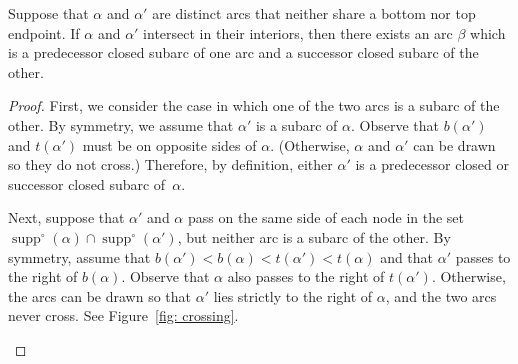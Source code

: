 \documentclass[ALCO,ThmDefs,Unicode,epreuves]{cedram}
\DeclareMathOperator{\supp}{supp}
\newcommand{\suppo}{\supp^{\circ}}
\renewcommand{\1}{\hat{1}}
\newcommand{\0}{\hat{0}}
\begin{document}
\begin{lemma}\label{crossing}
Suppose that $\alpha$ and $\alpha'$ are distinct arcs that neither
share a bottom nor top endpoint.
If $\alpha$ and $\alpha'$ intersect in
their interiors, then there exists an arc $\beta$ which is a predecessor closed subarc of one arc and a successor closed subarc of the other.
\end{lemma}
\begin{proof}
First, we consider the case in which one of the two arcs is a subarc of the other.
By symmetry, we assume that $\alpha'$ is a subarc of $\alpha$.
Observe that $b(\alpha')$ and $t(\alpha')$ must be on opposite sides of $\alpha$.
(Otherwise, $\alpha$ and $\alpha'$ can be drawn so they do not cross.)
Therefore, by definition, either $\alpha'$ is a predecessor closed or
successor closed subarc of~$\alpha$.

Next, suppose that $\alpha'$ and $\alpha$ pass on the same side of each node in the set $\suppo(\alpha)\cap\suppo(\alpha')$, but neither arc is a subarc of the other.
By symmetry, assume that $b(\alpha')<b(\alpha) < t(\alpha')<t(\alpha)$ and that $\alpha'$ passes to the right of $b(\alpha)$.
Observe that $\alpha$ also passes to the right of $t(\alpha')$.
Otherwise, the arcs can be drawn so that $\alpha'$ lies strictly to the right of $\alpha$, and the two arcs never cross.
See Figure~\ref{fig: crossing}.

\begin{figure}[htb]
\end{figure}
\end{proof}
\end{document}

